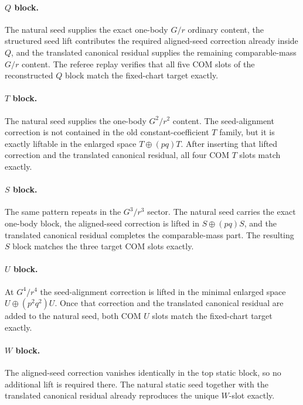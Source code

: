 \documentclass[11pt]{article}
\begin{document}
\paragraph{$Q$ block.}
The natural seed supplies the exact one-body $G/r$ ordinary content, the
structured seed lift contributes the required aligned-seed correction already
inside $Q$, and the translated canonical residual supplies the remaining
comparable-mass $G/r$ content.  The referee replay verifies that all five COM
slots of the reconstructed $Q$ block match the fixed-chart target exactly.

\paragraph{$T$ block.}
The natural seed supplies the one-body $G^2/r^2$ content.  The seed-alignment
correction is not contained in the old constant-coefficient $T$ family, but it
is exactly liftable in the enlarged space $T\oplus(pq)T$.
After inserting that lifted correction and the translated canonical residual,
all four COM $T$ slots match exactly.

\paragraph{$S$ block.}
The same pattern repeats in the $G^3/r^3$ sector.  The natural seed carries the
exact one-body block, the aligned-seed correction is lifted in
$S\oplus(pq)S$, and the translated canonical residual completes the
comparable-mass part.  The resulting $S$ block matches the three target COM
slots exactly.

\paragraph{$U$ block.}
At $G^4/r^4$ the seed-alignment correction is lifted in the minimal enlarged
space $U\oplus(p^2q^2)U$.  Once that correction and the translated canonical
residual are added to the natural seed, both COM $U$ slots match the fixed-chart
target exactly.

\paragraph{$W$ block.}
The aligned-seed correction vanishes identically in the top static block, so no
additional lift is required there.  The natural static seed together with the
translated canonical residual already reproduces the unique $W$-slot exactly.
\end{document}
